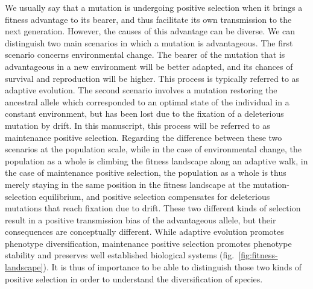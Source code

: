 \documentclass{article}
\begin{document}
    We usually say that a mutation is undergoing positive selection when it brings a fitness advantage to its bearer, and thus facilitate its own transmission to the next generation.
    However, the causes of this advantage can be diverse.
    We can distinguish two main scenarios in which a mutation is advantageous.
    The first scenario concerns environmental change.
    The bearer of the mutation that is advantageous in a new environment will be better adapted, and its chances of survival and reproduction will be higher.
    This process is typically referred to as adaptive evolution.
    The second scenario involves a mutation restoring the ancestral allele which corresponded to an optimal state of the individual in a constant environment, but has been lost due to the fixation of a deleterious mutation by drift.
    In this manuscript, this process will be referred to as maintenance positive selection.
    Regarding the difference between these two scenarios at the population scale, while in the case of environmental change, the population as a whole is climbing the fitness landscape along an adaptive walk\cite{tenaillon_utility_2014}, in the case of maintenance positive selection, the population as a whole is thus merely staying in the same position in the fitness landscape at the mutation-selection equilibrium, and positive selection compensates for deleterious mutations that reach fixation due to drift\cite{sella_application_2005, mustonen_fitness_2009}.
    These two different kinds of selection result in a positive transmission bias of the advantageous allele, but their consequences are conceptually different.
    While adaptive evolution promotes phenotype diversification, maintenance positive selection promotes phenotype stability and preserves well established biological systems (fig.~\ref{fig:fitness-landscape}).
    It is thus of importance to be able to distinguish those two kinds of positive selection in order to understand the diversification of species.
\end{document}
